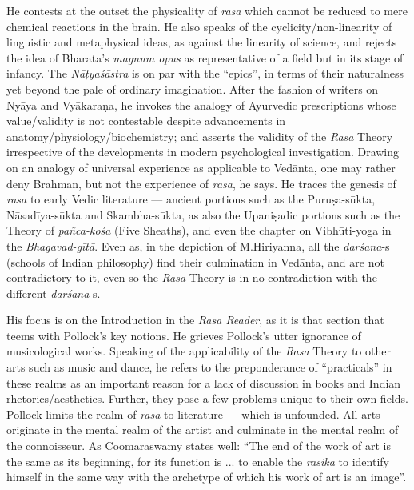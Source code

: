 He contests at the outset the physicality of \textsl{rasa} which cannot be reduced to mere chemical reactions in the brain. He also speaks of the cyclicity/non-linearity of linguistic and metaphysical ideas, as against the linearity of science, and rejects the idea of Bharata’s \textsl{magnum opus} as representative of a field but in its stage of infancy. The \textsl{Nāṭyaśāstra} is on par with the “epics”, in terms of their naturalness yet beyond the pale of ordinary imagination. After the fashion of writers on Nyāya and Vyākaraṇa, he invokes the analogy of Ayurvedic prescriptions whose value/validity is not contestable despite advancements in anatomy/physiology/biochemistry; and asserts the validity of the \textsl{Rasa} Theory irrespective of the developments in modern psychological investigation. Drawing on an analogy of universal experience as applicable to Vedānta, one may rather deny Brahman, but not the experience of \textsl{rasa}, he says. He traces the genesis of \textsl{rasa} to early Vedic literature --- ancient portions such as the Puruṣa-sūkta, Nāsadīya-sūkta and Skambha-sūkta, as also the Upaniṣadic portions such as the Theory of \textsl{pañca-kośa} (Five Sheaths), and even the chapter on Vibhūti-yoga in the \textsl{Bhagavad-gītā}. Even as, in the depiction of M.\@ Hiriyanna, all the \textsl{darśana}-s (schools of Indian philosophy) find their culmination in Vedānta, and are not contradictory to it, even so the \textsl{Rasa} Theory is in no contradiction with the different \textsl{darśana}-s.

His focus is on the Introduction in the \textsl{Rasa Reader}, as it is that section that teems with Pollock’s key notions. He grieves Pollock’s utter ignorance of musicological works. Speaking of the applicability of the \textsl{Rasa} Theory to other arts such as music and dance, he refers to the preponderance of “practicals” in these realms as an important reason for a lack of discussion in books and Indian rhetorics/aesthetics. Further, they pose a few problems unique to their own fields. Pollock limits the realm of \textsl{rasa} to literature --- which is unfounded. All arts originate in the mental realm of the artist and culminate in the mental realm of the connoisseur. As Coomaraswamy states well: “The end of the work of art is the same as its beginning, for its function is ... to enable the \textsl{rasika} to identify himself in the same way with the archetype of which his work of art is an image”.

